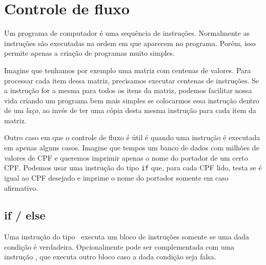 
\chapter{Controle de fluxo}

Um programa de computador é uma sequência de instruções. Normalmente as instruções são executadas na ordem em que aparecem no programa. Porém, isso permite apenas a criação de programas muito simples. 

Imagine que tenhamos por exemplo uma matriz com centenas de valores. Para processar cada item dessa matriz, precisamos executar centenas de instruções. Se a instrução for a mesma para todos os itens da matriz, podemos facilitar nossa vida criando um programa bem mais simples se colocarmos essa instrução dentro de um {\it laço}, ao invés de ter uma cópia desta mesma instrução para cada item da matriz.

Outro caso em que o controle de fluxo é útil é quando uma instrução é executada em apenas alguns casos. Imagine que tempos um banco de dados com milhões de valores de CPF e queremos imprimir apenas o nome do portador de um certo CPF. Podemos usar uma instrução do tipo {\tt if} que, para cada CPF lido, testa se é igual ao CPF desejado e imprime o nome do portador somente em caso afirmativo.


\section{if / else}

Uma instrução do tipo \IF\ executa um bloco de instruções somente se uma dada condição é verdadeira. Opcionalmente pode ser complementada com uma instrução \ELSE, que executa outro bloco caso a dada condição seja falsa.

